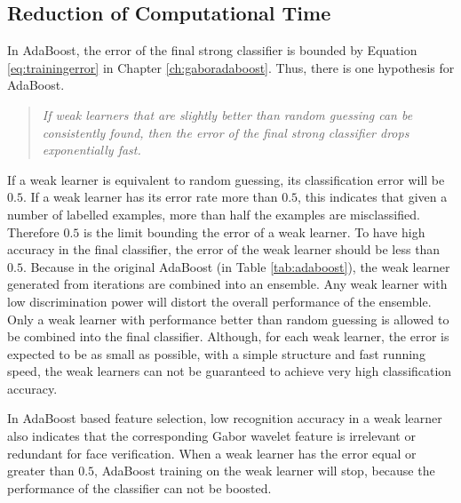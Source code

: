 \subsection{Reduction of Computational Time}
\label{sec:faceveri:time}
In AdaBoost, the error of the final strong classifier is bounded by \mbox{Equation} \ref{eq:trainingerror} in \mbox{Chapter} \ref{ch:gaboradaboost}. Thus, there is one hypothesis for AdaBoost. 
\begin{quote}
\textit{If weak learners that are slightly better than random guessing can be consistently found, then the error of the final strong classifier drops exponentially fast.} \cite{Freund1995}
\end{quote}
If a weak learner is equivalent to random guessing, its classification error will be $0.5$. If a weak learner has its error rate more than $0.5$, this indicates that given a number of labelled examples, more than half the examples are misclassified. Therefore $0.5$ is the limit bounding the error of a weak learner. To have high accuracy in the final classifier, the error of the weak learner should be less than $0.5$. Because in the original AdaBoost (in \mbox{Table} \ref{tab:adaboost}), the weak learner generated from iterations are combined into an ensemble. Any weak learner with low discrimination power will distort the overall performance of the ensemble. Only a weak learner with performance better than random guessing is allowed to be combined into the final classifier. Although, for each weak learner, the error is expected to be as small as possible, with a simple structure and fast running speed, the weak learners can not be guaranteed to achieve very high classification accuracy.

In AdaBoost based feature selection, low recognition accuracy in a weak learner also indicates that the corresponding Gabor wavelet feature is irrelevant or redundant for face verification.  When a weak learner has the error equal or greater than $0.5$, AdaBoost training on the weak learner will stop, because the performance of the classifier can not be boosted. 

